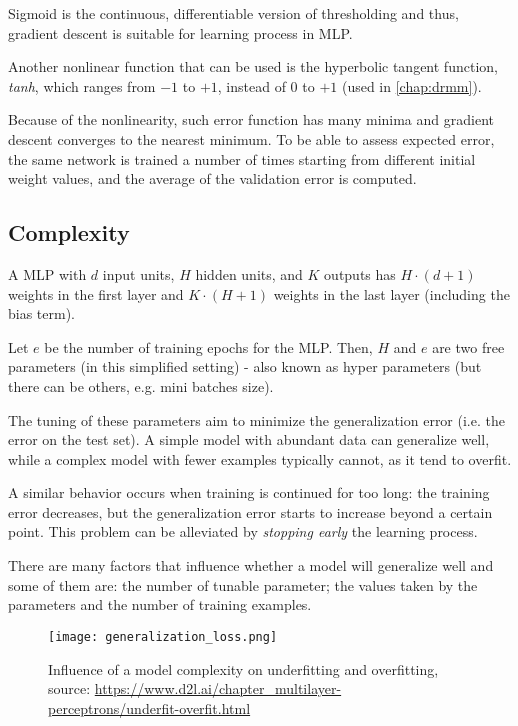 Sigmoid is the continuous, differentiable version of thresholding and thus, gradient descent is suitable for learning process in MLP.

Another nonlinear function that can be used is the hyperbolic tangent function, \textit{tanh}, which ranges from $-1$ to $+1$, instead of $0$ to $+1$ (used in \ref{chap:drmm}).

Because of the nonlinearity, such error function has many minima and gradient descent converges to the nearest minimum. To be able to assess expected  error,  the  same  network  is  trained  a  number  of  times  starting from different initial weight values, and the average of the validation error is computed.

\subsection{Complexity}

A MLP with $d$ input units, $H$ hidden units, and $K$ outputs has $H \cdot (d+1)$ weights in the first layer and $K \cdot (H+1)$ weights in the last layer (including the bias term).

Let $e$ be the number of training epochs for the MLP. Then, $H$ and $e$ are two free parameters (in this simplified setting) - also known as hyper parameters (but there can be others, e.g. mini batches size).

The tuning of these parameters aim to minimize the generalization error (i.e. the error on the test set).
A simple model with abundant data can generalize well, while a complex model with fewer examples typically cannot, as it tend to overfit.

A similar behavior occurs when training is continued for too long: the training error decreases, but the generalization error starts to increase beyond a certain point. This problem can be alleviated by \textit{stopping early} the learning process.

There are many factors that influence whether a model will generalize well and some of them are: the number of tunable parameter; the values taken by the parameters and the number of training examples.

\begin{figure}[H]
  \centering
  \texttt{[image: generalization\_loss.png]}
  \caption{Influence of a model complexity on underfitting and overfitting, source: \url{https://www.d2l.ai/chapter_multilayer-perceptrons/underfit-overfit.html}}
  \label{fig:model_compl}
\end{figure}

